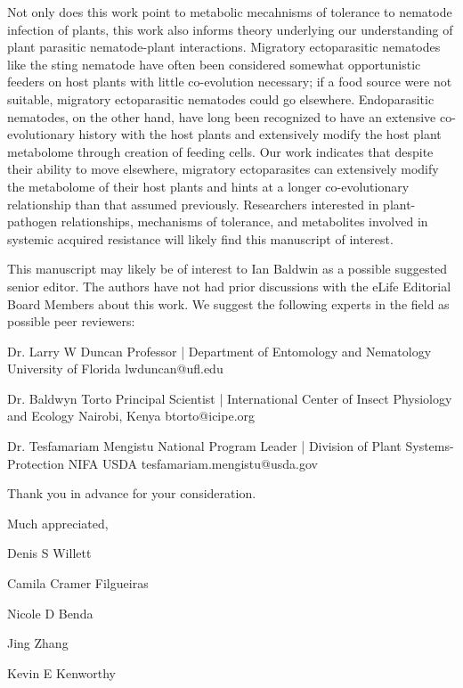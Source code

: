 \documentclass{article}
\begin{document}
Not only does this work point to metabolic mecahnisms of tolerance to nematode infection of plants, this work also informs theory underlying our understanding of plant parasitic nematode-plant interactions.  Migratory ectoparasitic nematodes like the sting nematode have often been considered somewhat opportunistic feeders on host plants with little co-evolution necessary; if a food source were not suitable, migratory ectoparasitic nematodes could go elsewhere.  Endoparasitic nematodes, on the other hand, have long been recognized to have an extensive co-evolutionary history with the host plants and extensively modify the host plant metabolome through creation of feeding cells.  Our work indicates that despite their ability to move elsewhere, migratory ectoparasites can extensively modify the metabolome of their host plants and hints at a longer co-evolutionary relationship than that assumed previously.  Researchers interested in plant-pathogen relationships, mechanisms of tolerance, and metabolites involved in systemic acquired resistance will likely find this manuscript of interest.  


This manuscript may likely be of interest to Ian Baldwin as a possible suggested senior editor. The authors have not had prior discussions with the eLife Editorial Board Members about this work.  We suggest the following experts in the field as possible peer reviewers:


\setlength{\parindent}{0cm}
\begin{addmargin}[1in]{}

Dr. Larry W Duncan \newline
Professor | Department of Entomology and Nematology \newline
University of Florida \newline
lwduncan@ufl.edu \newline

Dr. Baldwyn Torto \newline
Principal Scientist | International Center of Insect Physiology and Ecology \newline
Nairobi, Kenya \newline
btorto@icipe.org \newline

Dr. Tesfamariam Mengistu \newline
National Program Leader | Division of Plant Systems-Protection \newline
NIFA USDA \newline
tesfamariam.mengistu@usda.gov \newline

\end{addmargin}

Thank you in advance for your consideration.  

\vspace{2em}

Much appreciated, \newline

\vspace{1em}

Denis S Willett
\vspace{0.48em}

Camila Cramer Filgueiras
\vspace{0.48em}

Nicole D Benda
\vspace{0.48em}

Jing Zhang
\vspace{0.48em} 

Kevin E Kenworthy
\end{document}
